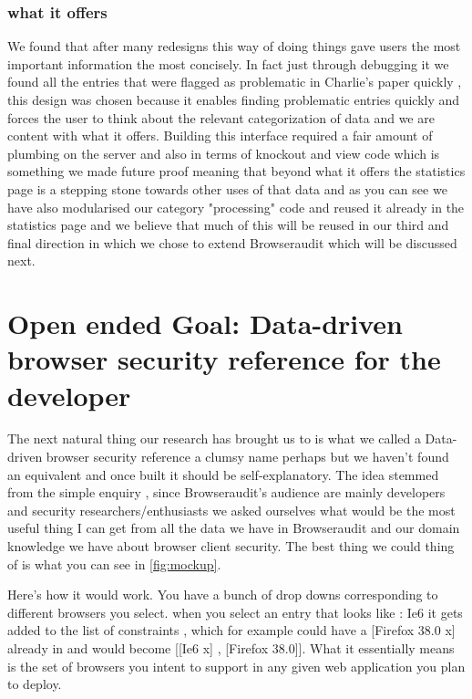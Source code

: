 \subsubsection{what it offers}
We found that after many redesigns this way of doing things gave users the most important information the most concisely. In fact just through debugging it
we found all the entries that were flagged as problematic in Charlie's paper \cite{charlie} quickly , this design was chosen because it enables finding 
problematic entries quickly and forces the user to think about the relevant categorization of data and we are content with what it offers.
Building this interface required a fair amount of plumbing on the server and also in terms of knockout and view code which is something we made future proof
meaning that beyond what it offers the statistics page is a stepping stone towards other uses of that data and as you can see we have also modularised our
category "processing" code and reused it already in the statistics page and we believe that much of this will be reused in our third and final direction in which we
chose to extend Browseraudit which will be discussed next.

\section{Open ended Goal: Data-driven browser security reference for the developer }
\label{open}

The next natural thing our research has brought us to is what we called a Data-driven browser security reference a clumsy name perhaps but we haven't found an equivalent
and once built it should be self-explanatory. The idea stemmed from the simple enquiry , since Browseraudit's audience are mainly developers and security researchers/enthusiasts
we asked ourselves what would be the most useful thing I can get from all the data we have in Browseraudit and our domain knowledge we have about browser client security.
The best thing we could thing of is what you can see in \ref{fig:mockup}.

Here's how it would work. You have a bunch of drop downs corresponding to different browsers you select. when you select an entry that looks like :
Ie6 it gets added to the list of constraints , which for example could have a [Firefox 38.0 x] already in and would become 
[[Ie6 x] , [Firefox 38.0]]. What it essentially means is the set of browsers you intent to support in any given web application you plan to deploy.


